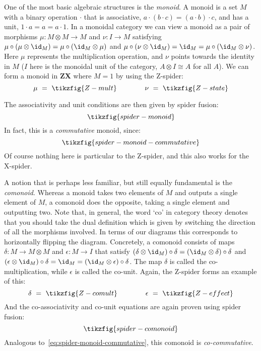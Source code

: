 \documentclass[a4paper,onecolumn,superscriptaddress,11pt,%
				unpublished,%
				allowfontchageintitle,%
				]{quantumarticle}
\begin{document}
One of the most basic algebraic structures is the \emph{monoid}. A monoid is a set $M$ with a binary operation $\cdot$ that is associative, $a\cdot(b\cdot c) = (a\cdot b)\cdot c$, and has a unit, $1\cdot a = a = a\cdot 1$. In a monoidal category we can view a monoid as a pair of morphisms $\mu:M\otimes M\rightarrow M$ and $\nu:I\rightarrow M$ satisfying $\mu\circ(\mu\otimes \id_M) = \mu\circ(\id_M\otimes \mu)$ and $\mu\circ(\nu\otimes \id_M) = \id_M = \mu\circ(\id_M\otimes \nu)$. Here $\mu$ represents the multiplication operation, and $\nu$ points towards the identity in $M$ ($I$ here is the monoidal unit of the category, $A\otimes I \cong A$ for all $A$).
We can form a monoid in \textbf{ZX} where $M=1$ by using the Z-spider:
\begin{equation}
	\mu \ =\  \tikzfig{Z-mult} \qquad \qquad \nu\  =\  \tikzfig{Z-state}
\end{equation}

The associativity and unit conditions are then given by spider fusion:
\begin{equation}
\tikzfig{spider-monoid}
\end{equation}
In fact, this is a \emph{commutative} monoid, since:
\begin{equation}\label{eq:spider-monoid-commutative}
\tikzfig{spider-monoid-commutative}
\end{equation}
Of course nothing here is particular to the Z-spider, and this also works for the X-spider.

A notion that is perhaps less familiar, but still equally fundamental is the \emph{comonoid}. Whereas a monoid takes two elements of $M$ and outputs a single element of $M$, a comonoid does the opposite, taking a single element and outputting two. Note that, in general, the word `co' in category theory denotes that you should take the dual definition which is given by switching the direction of all the morphisms involved. In terms of our diagrams this corresponds to horizontally flipping the diagram. Concretely, a comonoid consists of maps $\delta: M\rightarrow M\otimes M$ and $\epsilon: M\rightarrow I$ that satisfy $(\delta\otimes \id_M)\circ \delta = (\id_M\otimes \delta)\circ \delta$ and $(\epsilon\otimes \id_M)\circ \delta = \id_M = (\id_M\otimes \epsilon)\circ\delta$. The map $\delta$ is called the co-multiplication, while $\epsilon$ is called the co-unit. Again, the Z-spider forms an example of this:
\begin{equation}
	\delta \ =\  \tikzfig{Z-comult} \qquad \qquad \epsilon\  =\  \tikzfig{Z-effect}
\end{equation}
And the co-associativity and co-unit equations are again proven using spider fusion:
\begin{equation}
\tikzfig{spider-comonoid}
\end{equation}
Analogous to~\eqref{eq:spider-monoid-commutative}, this comonoid is \emph{co-commutative}.
\end{document}
